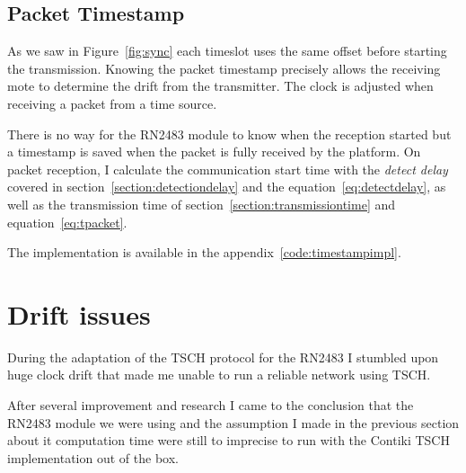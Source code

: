 \subsection{Packet Timestamp}

As we saw in Figure~\ref{fig:sync} each timeslot uses the same offset before 
starting the transmission.
Knowing the packet timestamp precisely allows the receiving mote to determine the
drift from the transmitter. 
The clock is adjusted when receiving a packet from a time source.

There is no way for the RN2483 module to know when the reception started but
a timestamp is saved when the packet is fully received by the platform.
On packet reception, I calculate the communication start time with the 
\emph{detect delay} covered in section~\ref{section:detectiondelay} and the
equation~\ref{eq:detectdelay}, as well as the transmission time of
section~\ref{section:transmissiontime} and equation~\ref{eq:tpacket}.

The implementation is available in the appendix~\ref{code:timestampimpl}.




\section{Drift issues}

During the adaptation of the TSCH protocol for the RN2483 I stumbled upon huge
clock drift that made me unable to run a reliable network using TSCH.

After several improvement and research I came to the conclusion that the RN2483
module we were using and the assumption I made in the previous section about it
computation time were still to imprecise to run with the Contiki TSCH
implementation out of the box.

